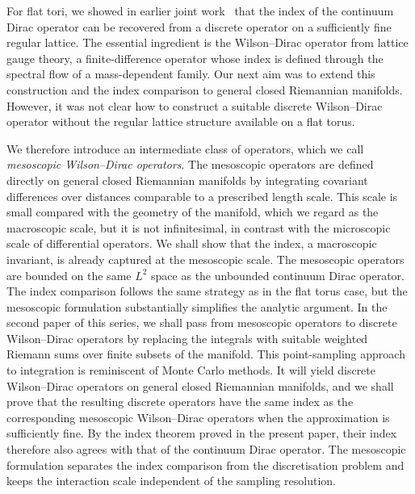 \documentclass[a4paper,oneside,12pt]{amsart}
\theoremstyle{plain}
\theoremstyle{definition}
\theoremstyle{remark}
\begin{document}
For flat tori, we showed in earlier joint work~\cite{MR5076866} that the index of the continuum Dirac operator can be recovered from a discrete operator on a sufficiently fine regular lattice.
The essential ingredient is the Wilson--Dirac operator from lattice gauge theory, a finite-difference operator whose index is defined through the spectral flow of a mass-dependent family.
Our next aim was to extend this construction and the index comparison to general closed Riemannian manifolds.
However, it was not clear how to construct a suitable discrete Wilson--Dirac operator without the regular lattice structure available on a flat torus.

We therefore introduce an intermediate class of operators, which we call \emph{mesoscopic Wilson--Dirac operators}.
The mesoscopic operators are defined directly on general closed Riemannian manifolds by integrating covariant differences over distances comparable to a prescribed length scale.
This scale is small compared with the geometry of the manifold, which we regard as the macroscopic scale, but it is not infinitesimal, in contrast with the microscopic scale of differential operators.
We shall show that the index, a macroscopic invariant, is already captured at the mesoscopic scale.
The mesoscopic operators are bounded on the same $L^2$ space as the unbounded continuum Dirac operator.
The index comparison follows the same strategy as in the flat torus case, but the mesoscopic formulation substantially simplifies the analytic argument.
In the second paper of this series, we shall pass from mesoscopic operators to discrete Wilson--Dirac operators by replacing the integrals with suitable weighted Riemann sums over finite subsets of the manifold.
This point-sampling approach to integration is reminiscent of Monte Carlo methods.
It will yield discrete Wilson--Dirac operators on general closed Riemannian manifolds, and we shall prove that the resulting discrete operators have the same index as the corresponding mesoscopic Wilson--Dirac operators when the approximation is sufficiently fine.
By the index theorem proved in the present paper, their index therefore also agrees with that of the continuum Dirac operator.
The mesoscopic formulation separates the index comparison from the discretisation problem and keeps the interaction scale independent of the sampling resolution.
\end{document}
